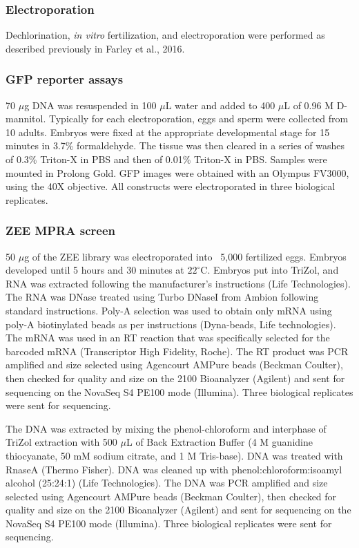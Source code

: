 \subsubsection{Electroporation}
Dechlorination, \textit{in vitro} fertilization, and electroporation were performed as described previously in Farley et al., 2016.

\subsubsection{GFP reporter assays}
70 $\mu$g DNA was resuspended in 100 $\mu$L water and added to 400 $\mu$L of 0.96 M D-mannitol. Typically for each electroporation, eggs and sperm were collected from 10 adults. Embryos were fixed at the appropriate developmental stage for 15 minutes in 3.7\% formaldehyde. The tissue was then cleared in a series of washes of 0.3\% Triton-X in PBS and then of 0.01\% Triton-X in PBS. Samples were mounted in Prolong Gold. GFP images were obtained with an Olympus FV3000, using the 40X objective. All constructs were electroporated in three biological replicates.

\subsubsection{ZEE MPRA screen}
50 $\mu$g of the ZEE library was electroporated into ~5,000 fertilized eggs. Embryos developed until 5 hours and 30 minutes at $22^\circ$C. Embryos put into TriZol, and RNA was extracted following the manufacturer's instructions (Life Technologies). The RNA was DNase treated using Turbo DNaseI from Ambion following standard instructions. Poly-A selection was used to obtain only mRNA using poly-A biotinylated beads as per instructions (Dyna-beads, Life technologies). The mRNA was used in an RT reaction that was specifically selected for the barcoded mRNA (Transcriptor High Fidelity, Roche). The RT product was PCR amplified and size selected using Agencourt AMPure beads (Beckman Coulter), then checked for quality and size on the 2100 Bioanalyzer (Agilent) and sent for sequencing on the NovaSeq S4 PE100 mode (Illumina). Three biological replicates were sent for sequencing. 

The DNA was extracted by mixing the phenol-chloroform and interphase of TriZol extraction with 500 $\mu$L of Back Extraction Buffer (4 M guanidine thiocyanate, 50 mM sodium citrate, and 1 M Tris-base). DNA was treated with RnaseA (Thermo Fisher). DNA was cleaned up with phenol:chloroform:isoamyl alcohol (25:24:1) (Life Technologies). The DNA was PCR amplified and size selected using Agencourt AMPure beads (Beckman Coulter), then checked for quality and size on the 2100 Bioanalyzer (Agilent) and sent for sequencing on the NovaSeq S4 PE100 mode (Illumina). Three biological replicates were sent for sequencing.

